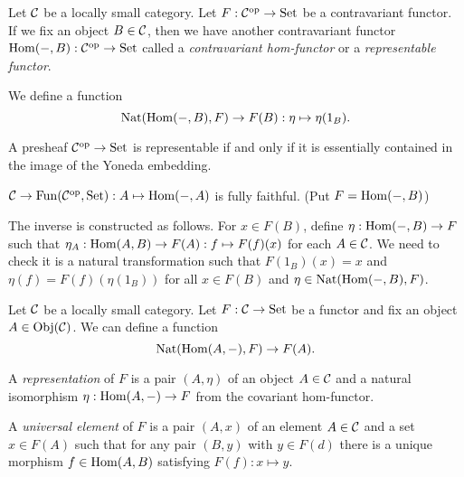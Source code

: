 \documentclass{../../large}
\begin{document}
\begin{prb}
Let $\mathcal{C}$ be a locally small category.
Let $F:\mathcal{C}^{\mathrm{op}}\to\mathrm{Set}$ be a contravariant functor.
If we fix an object $B\in\mathcal{C}$, then we have another contravariant functor $\operatorname{Hom}(-,B):\mathcal{C}^{\mathrm{op}}\to\mathrm{Set}$ called a \emph{contravariant hom-functor} or a \emph{representable functor}.

We define a function
\[\operatorname{Nat}(\operatorname{Hom}(-,B),F)\to F(B):\eta\mapsto\eta(1_B).\]

A presheaf $\mathcal{C}^{\mathrm{op}}\to\mathrm{Set}$ is representable if and only if it is essentially contained in the image of the Yoneda embedding.
\begin{parts}
\item $\mathcal{C}\to\operatorname{Fun}(\mathcal{C}^{\mathrm{op}},\mathrm{Set}):A\mapsto\operatorname{Hom}(-,A)$ is fully faithful. (Put $F=\operatorname{Hom}(-,B)$)
\end{parts}
\end{prb}
\begin{pf}

The inverse is constructed as follows.
For $x\in F(B)$, define $\eta:\operatorname{Hom}(-,B)\to F$ such that $\eta_A:\operatorname{Hom}(A,B)\to F(A):f\mapsto F(f)(x)$ for each $A\in\mathcal{C}$.
We need to check it is a natural transformation such that $F(1_B)(x)=x$ and $\eta(f)=F(f)(\eta(1_B))$ for all $x\in F(B)$ and $\eta\in\operatorname{Nat}(\operatorname{Hom}(-,B),F)$.
\end{pf}

\begin{prb}
Let $\mathcal{C}$ be a locally small category.
Let $F:\mathcal{C}\to\mathrm{Set}$ be a functor and fix an object $A\in\operatorname{Obj}(\mathcal{C})$.
We can define a function
\[\operatorname{Nat}(\operatorname{Hom}(A,-),F)\to F(A).\]

A \emph{representation} of $F$ is a pair $(A,\eta)$ of an object $A\in\mathcal{C}$ and a natural isomorphism $\eta:\operatorname{Hom}(A,-)\to F$ from the covariant hom-functor.

A \emph{universal element} of $F$ is a pair $(A,x)$ of an element $A\in\mathcal{C}$ and a set $x\in F(A)$ such that for any pair $(B,y)$ with $y\in F(d)$ there is a unique morphism $f\in\operatorname{Hom}(A,B)$ satisfying $F(f):x\mapsto y$.

\begin{parts}
\item
\end{parts}
\end{prb}
\end{document}
